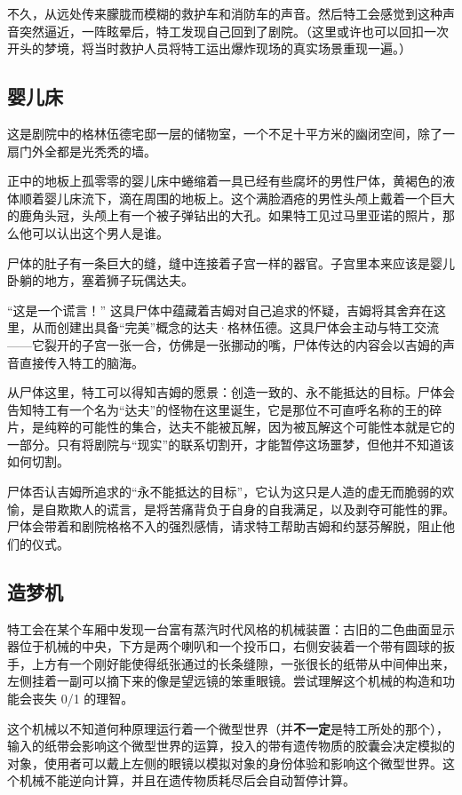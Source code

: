 不久，从远处传来朦胧而模糊的救护车和消防车的声音。然后特工会感觉到这种声音突然逼近，一阵眩晕后，特工发现自己回到了剧院。（这里或许也可以回扣一次开头的梦境，将当时救护人员将特工运出爆炸现场的真实场景重现一遍。）

\subsection{婴儿床}
这是剧院中的格林伍德宅邸一层的储物室，一个不足十平方米的幽闭空间，除了一扇门外全都是光秃秃的墙。

正中的地板上孤零零的婴儿床中蜷缩着一具已经有些腐坏的男性尸体，黄褐色的液体顺着婴儿床流下，滴在周围的地板上。这个满脸酒疮的男性头颅上戴着一个巨大的鹿角头冠，头颅上有一个被子弹钻出的大孔。如果特工见过马里亚诺的照片，那么他可以认出这个男人是谁。

尸体的肚子有一条巨大的缝，缝中连接着子宫一样的器官。子宫里本来应该是婴儿卧躺的地方，塞着狮子玩偶达夫。

“这是一个谎言！” 这具尸体中蕴藏着吉姆对自己追求的怀疑，吉姆将其舍弃在这里，从而创建出具备“完美”概念的达夫·格林伍德。这具尸体会主动与特工交流——它裂开的子宫一张一合，仿佛是一张挪动的嘴，尸体传达的内容会以吉姆的声音直接传入特工的脑海。

从尸体这里，特工可以得知吉姆的愿景：创造一致的、永不能抵达的目标。尸体会告知特工有一个名为“达夫”的怪物在这里诞生，它是那位不可直呼名称的王的碎片，是纯粹的可能性的集合，达夫不能被瓦解，因为被瓦解这个可能性本就是它的一部分。只有将剧院与“现实”的联系切割开，才能暂停这场噩梦，但他并不知道该如何切割。

尸体否认吉姆所追求的“永不能抵达的目标”，它认为这只是人造的虚无而脆弱的欢愉，是自欺欺人的谎言，是将苦痛背负于自身的自我满足，以及剥夺可能性的罪。尸体会带着和剧院格格不入的强烈感情，请求特工帮助吉姆和约瑟芬解脱，阻止他们的仪式。

\subsection{造梦机}
特工会在某个车厢中发现一台富有蒸汽时代风格的机械装置：古旧的二色曲面显示器位于机械的中央，下方是两个喇叭和一个投币口，右侧安装着一个带有圆球的扳手，上方有一个刚好能使得纸张通过的长条缝隙，一张很长的纸带从中间伸出来，左侧挂着一副可以摘下来的像是望远镜的笨重眼镜。尝试理解这个机械的构造和功能会丧失 0/1 的理智。

这个机械以不知道何种原理运行着一个微型世界（并\textbf{不一定}是特工所处的那个），输入的纸带会影响这个微型世界的运算，投入的带有遗传物质的胶囊会决定模拟的对象，使用者可以戴上左侧的眼镜以模拟对象的身份体验和影响这个微型世界。这个机械不能逆向计算，并且在遗传物质耗尽后会自动暂停计算。

